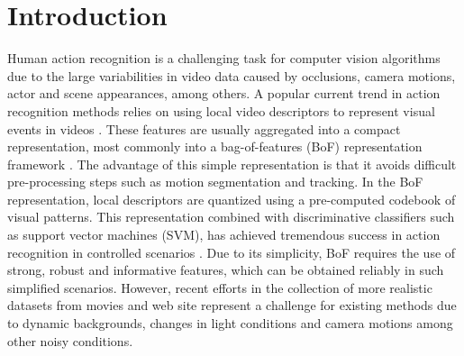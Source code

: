 \section{Introduction}
\label{introduction}

Human action recognition is a challenging task for computer vision algorithms due to the large variabilities in video data caused by occlusions,
camera motions, actor and scene appearances, among others. A popular current trend in action recognition methods relies on using local video
descriptors to represent visual events in videos \cite{Dollar2005, Laptev2005, WangCVPR2011}. These features are usually aggregated into
a compact representation, most commonly into a bag-of-features (BoF) representation framework \cite{Schuldt2004}. The advantage of this
simple representation is that it avoids difficult pre-processing steps such as motion segmentation and tracking.
In the BoF representation, local descriptors are quantized using a pre-computed codebook of visual patterns. This representation combined
with discriminative classifiers such as support vector machines (SVM), has achieved tremendous success in action recognition in controlled
scenarios \cite{Blank2005,Schuldt2004}. Due to its simplicity, BoF requires the use of strong, robust and informative features, which can be 
obtained reliably in such simplified scenarios. However, recent efforts in the collection of more realistic datasets from movies and web site 
\cite{Kuehne2011,Marszalek2009,Rodriguez2008} represent a challenge for existing methods due to dynamic backgrounds, changes in light 
conditions and camera motions among other noisy conditions. 

